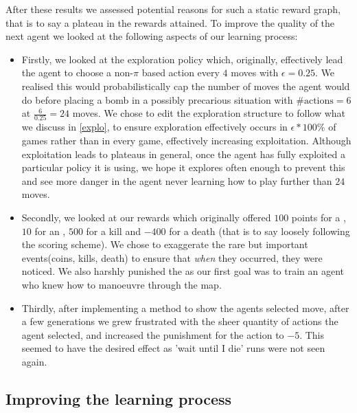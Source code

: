 After these results we assessed potential reasons for such a static reward graph, that is to say a plateau in the rewards attained. To improve the quality of the next agent we looked at the following aspects of our learning process:
\begin{itemize}
	\item Firstly, we looked at the exploration policy which, originally, effectively lead the agent to choose a non-$\pi$ based action every $4$ moves with $\epsilon=0.25$. We realised this would probabilistically cap the number of moves the agent would do before placing a bomb in a possibly precarious situation with $\#\text{actions}=6$ at $\frac{6}{0.25}=24$ moves. We chose to edit the exploration structure to follow what we discuss in \ref{explo}, to ensure exploration effectively occurs in $\epsilon*100\%$ of games rather than in every game, effectively increasing exploitation. Although exploitation leads to plateaus in general, once the agent has fully exploited a particular policy it is using, we hope it explores often enough to prevent this and see more danger in the agent never learning how to play further than $24$ moves. 
	\item Secondly, we looked at our rewards which originally offered $100$ points for a , $10$ for an , $500$ for a kill and $-400$ for a death (that is to say loosely following the scoring scheme). We chose to exaggerate the rare but important events(coins, kills, death) to ensure that \textit{when} they occurred, they were noticed. We also harshly punished the  as our first goal was to train an agent who knew how to manoeuvre through the map.
	\item Thirdly, after implementing a method to show the agents selected move, after a few generations we grew frustrated with the sheer quantity of  actions the agent selected, and increased the punishment for the action to $-5$. This seemed to have the desired effect as 'wait until I die' runs were not seen again.
\end{itemize}

\subsection{Improving the learning process}
